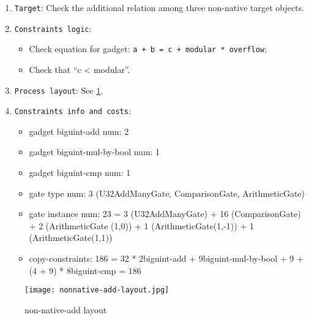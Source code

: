 
\begin{enumerate}
    \item \verb|Target|: Check the additional relation among three non-native target objects.
    \item \verb|Constraints logic|:
    \begin{itemize}
        \item Check equation for gadget: \verb|a + b = c + modular * overflow|;
        \item Check that ``c < modular''.
    \end{itemize}
    \item \verb|Process layout|: See \ref{fig:non-native-add-layout}.
    \item \verb|Constraints info and costs|:
    \begin{itemize}
        \item gadget biguint-add num: 2
        \item gadget biguint-mul-by-bool num: 1
        \item gadget biguint-cmp num: 1
        \item gate type num: 3 (U32AddManyGate, ComparisonGate, ArithmeticGate)
        \item gate instance num: 23 = 3 (U32AddManyGate) + 16 (ComparisonGate) + 2 (ArithmeticGate (1,0)) + 1 (ArithmeticGate(1,-1)) + 1 (ArithmeticGate(1,1))
        \item copy-constraints: 186 = 32 * 2{biguint-add} + 9{biguint-mul-by-bool} + 9 + (4 + 9) * 8{biguint-cmp} = 186
    \end{itemize}
\end{enumerate}

\begin{figure}[!ht]
    \centering
    \texttt{[image: nonnative-add-layout.jpg]}
    \caption{non-native-add layout}
    \label{fig:non-native-add-layout}
\end{figure}

